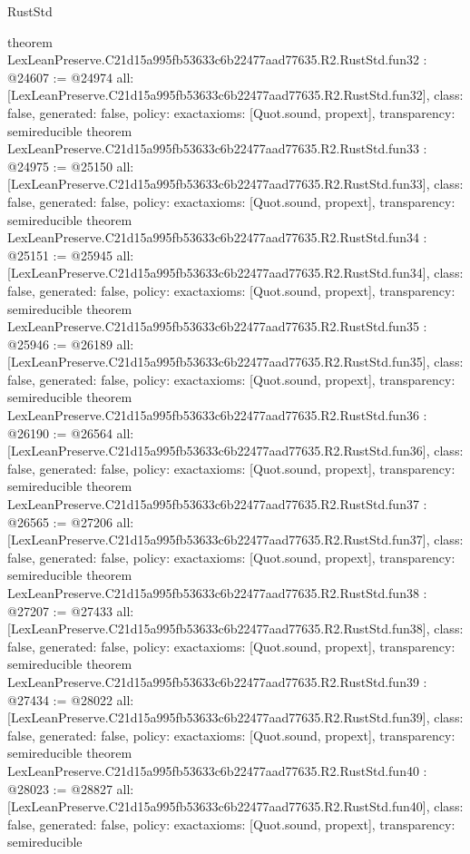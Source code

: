 \begin{lexlean}{RustStd}
\begin{coremodule}
{}
theorem LexLeanPreserve.C21d15a995fb53633c6b22477aad77635.R2.RustStd.fun32 : @24607 := @24974 {
  all: [LexLeanPreserve.C21d15a995fb53633c6b22477aad77635.R2.RustStd.fun32],
  class: false,
  generated: false,
  policy: exact{axioms: [Quot.sound, propext]},
  transparency: semireducible
}
theorem LexLeanPreserve.C21d15a995fb53633c6b22477aad77635.R2.RustStd.fun33 : @24975 := @25150 {
  all: [LexLeanPreserve.C21d15a995fb53633c6b22477aad77635.R2.RustStd.fun33],
  class: false,
  generated: false,
  policy: exact{axioms: [Quot.sound, propext]},
  transparency: semireducible
}
theorem LexLeanPreserve.C21d15a995fb53633c6b22477aad77635.R2.RustStd.fun34 : @25151 := @25945 {
  all: [LexLeanPreserve.C21d15a995fb53633c6b22477aad77635.R2.RustStd.fun34],
  class: false,
  generated: false,
  policy: exact{axioms: [Quot.sound, propext]},
  transparency: semireducible
}
theorem LexLeanPreserve.C21d15a995fb53633c6b22477aad77635.R2.RustStd.fun35 : @25946 := @26189 {
  all: [LexLeanPreserve.C21d15a995fb53633c6b22477aad77635.R2.RustStd.fun35],
  class: false,
  generated: false,
  policy: exact{axioms: [Quot.sound, propext]},
  transparency: semireducible
}
theorem LexLeanPreserve.C21d15a995fb53633c6b22477aad77635.R2.RustStd.fun36 : @26190 := @26564 {
  all: [LexLeanPreserve.C21d15a995fb53633c6b22477aad77635.R2.RustStd.fun36],
  class: false,
  generated: false,
  policy: exact{axioms: [Quot.sound, propext]},
  transparency: semireducible
}
theorem LexLeanPreserve.C21d15a995fb53633c6b22477aad77635.R2.RustStd.fun37 : @26565 := @27206 {
  all: [LexLeanPreserve.C21d15a995fb53633c6b22477aad77635.R2.RustStd.fun37],
  class: false,
  generated: false,
  policy: exact{axioms: [Quot.sound, propext]},
  transparency: semireducible
}
theorem LexLeanPreserve.C21d15a995fb53633c6b22477aad77635.R2.RustStd.fun38 : @27207 := @27433 {
  all: [LexLeanPreserve.C21d15a995fb53633c6b22477aad77635.R2.RustStd.fun38],
  class: false,
  generated: false,
  policy: exact{axioms: [Quot.sound, propext]},
  transparency: semireducible
}
theorem LexLeanPreserve.C21d15a995fb53633c6b22477aad77635.R2.RustStd.fun39 : @27434 := @28022 {
  all: [LexLeanPreserve.C21d15a995fb53633c6b22477aad77635.R2.RustStd.fun39],
  class: false,
  generated: false,
  policy: exact{axioms: [Quot.sound, propext]},
  transparency: semireducible
}
theorem LexLeanPreserve.C21d15a995fb53633c6b22477aad77635.R2.RustStd.fun40 : @28023 := @28827 {
  all: [LexLeanPreserve.C21d15a995fb53633c6b22477aad77635.R2.RustStd.fun40],
  class: false,
  generated: false,
  policy: exact{axioms: [Quot.sound, propext]},
  transparency: semireducible
}
\end{coremodule}
\end{lexlean}
